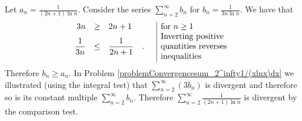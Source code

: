 {Let $a_n= \frac{1}{(2n+1)\ln n}$. Consider the series $\sum\limits_{n=2}^{\infty}b_n$ for  $b_n=\frac{1}{3n \ln n}$. We have that 
\[
\begin{array}{rcll|l}
3n &\geq & 2n+1 &&\text{for } n\geq 1\\
\displaystyle \frac{1}{3n} &\leq&\displaystyle  \frac{1}{2n+1} \quad .&& \begin{array}{@{}l}\text{Inverting positive}\\\text{quantities reverses} \\\text{inequalities} \end{array}
\end{array}
\]
Therefore $b_n\geq a_n$. In Problem \ref{problemConvergencesum_2^infty1/(xlnx)dx} we illustrated (using the integral test) that $ \sum\limits_{n=2}^\infty (3b_n) $ is divergent and therefore so is its constant multiple $\sum\limits_{n=2}^\infty b_n$. Therefore $ \sum \limits_{n=2 }^\infty \frac{1}{(2n+1)\ln n}$ is divergent by the comparison test. 
}